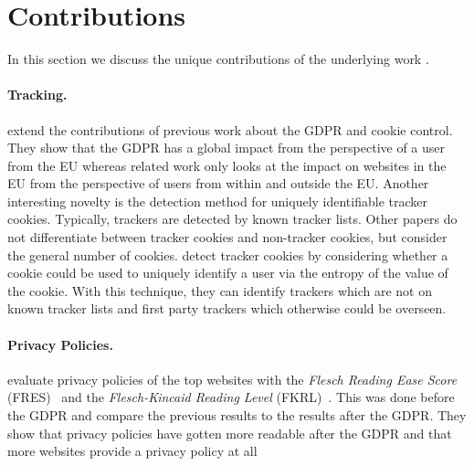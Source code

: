 \section{Contributions}
\label{sec:contrib}

In this section we discuss the unique contributions of the underlying work \cite{sanchez2019can}.

\paragraph{Tracking.}

\citeauthor{sanchez2019can} extend the contributions of previous work about the GDPR and cookie control. They show that
the GDPR has a global impact from the perspective of a user from the EU whereas related work only looks at the impact on
websites in the EU from the perspective of users from within and outside the EU. Another interesting novelty is the
detection method for uniquely identifiable tracker cookies. Typically, trackers are detected by known tracker lists.
Other papers do not differentiate between tracker cookies and non-tracker cookies, but consider the general number of
cookies. \citeauthor{sanchez2019can} detect tracker cookies by considering whether a cookie could be used to uniquely
identify a user via the entropy of the value of the cookie. With this technique, they can identify trackers which are not on known
tracker lists and first party trackers which otherwise could be overseen.

\paragraph{Privacy Policies.}

\citeauthor{sanchez2019can} evaluate privacy policies of the top websites with the \emph{Flesch Reading Ease Score} (FRES)~\cite{flesch1948new}
and the \emph{Flesch-Kincaid Reading Level} (FKRL)~\cite{kincaid1975derivation}.
This was done before the GDPR and \citeauthor{sanchez2019can} compare the previous results to the results after the
GDPR. They show that privacy policies have gotten more readable after the GDPR and that more websites provide a privacy
policy at all%

